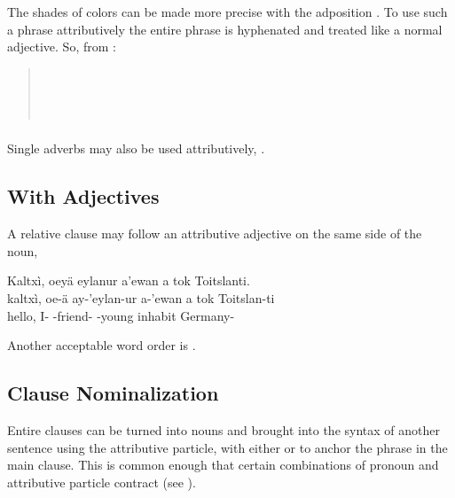\subsubsection{} The shades of colors can be made more precise with
the adposition  .  To use such a phrase attributively
the entire phrase is hyphenated and treated like a normal adjective.
So, from  :
\begin{quotation}
\indent{}\\
\indent{}\\
\indent{}\\
\indent{}
\end{quotation}
\label{syn:attr:na}

\subsubsection{} Single adverbs may also be used attributively,
 .

\subsection{With Adjectives} 
A relative clause may follow an attributive adjective on the same side
of the noun,

\begin{interlin}
\glll Kaltxì, oeyä eylanur a'ewan a tok Toitslanti. \\
      kaltxì, oe-ä ay-'eylan-ur a-'ewan a tok Toitslan-ti \\
      hello, I- -friend- -young  inhabit Germany-\\
 \Ipawl{}
\end{interlin}

\noindent Another acceptable word order is .

\subsection{Clause Nominalization} Entire clauses can be turned into
nouns and brought into the syntax of another sentence using the
attributive particle, with either  or  to anchor the
phrase in the main clause.  This is common enough that certain
combinations of pronoun and attributive particle contract (see
). \label{syn:clause-nom}

